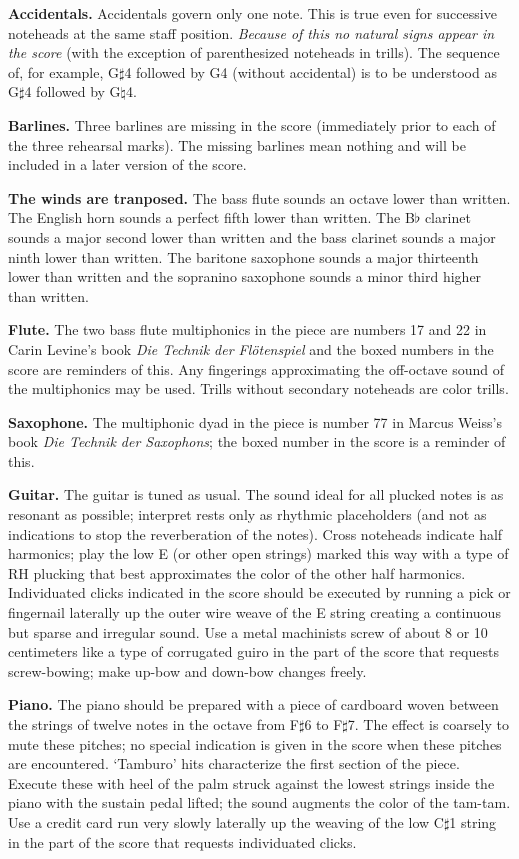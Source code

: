 \documentclass[10pt]{article}
\begin{document}
\begin{textblock}{23}
\textbf{Accidentals.} Accidentals govern only one note. This is true even for
successive noteheads at the same staff position. \textit{Because of this no
natural signs appear in the score} (with the exception of parenthesized
noteheads in trills). The sequence of, for example, G$\sharp$4 followed by
G4 (without accidental) is to be understood as G$\sharp$4 followed by
G$\natural$4.

\textbf{Barlines.} Three barlines are missing in the score (immediately prior
to each of the three rehearsal marks). The missing barlines mean nothing and
will be included in a later version of the score.

\textbf{The winds are tranposed.} The bass flute sounds an octave lower than
written. The English horn sounds a perfect fifth lower than written. The
B$\flat$ clarinet sounds a major second lower than written and the bass
clarinet sounds a major ninth lower than written. The baritone saxophone sounds
a major thirteenth lower than written and the sopranino saxophone sounds a
minor third higher than written.

\textbf{Flute.} The two bass flute multiphonics in the piece are numbers 17 and
22 in Carin Levine's book \textit{Die Technik der Flötenspiel} and the boxed
numbers in the score are reminders of this. Any fingerings approximating the
off-octave sound of the multiphonics may be used. Trills without secondary
noteheads are color trills.

\textbf{Saxophone.} The multiphonic dyad in the piece is number 77 in Marcus
Weiss's book \textit{Die Technik der Saxophons}; the boxed number in the score
is a reminder of this.

\textbf{Guitar.} The guitar is tuned as usual. The sound ideal for all plucked
notes is as resonant as possible; interpret rests only as rhythmic placeholders
(and not as indications to stop the reverberation of the notes). Cross
noteheads indicate half harmonics; play the low E (or other open strings)
marked this way with a type of RH plucking that best approximates the color of
the other half harmonics. Individuated clicks indicated in the score should be
executed by running a pick or fingernail laterally up the outer wire weave of
the E string creating a continuous but sparse and irregular sound. Use a metal
machinists screw of about 8 or 10 centimeters like a type of corrugated guiro
in the part of the score that requests screw-bowing; make up-bow and down-bow
changes freely.

\textbf{Piano.} The piano should be prepared with a piece of cardboard woven
between the strings of twelve notes in the octave from F$\sharp$6 to
F$\sharp$7. The effect is coarsely to mute these pitches; no special indication
is given in the score when these pitches are encountered. `Tamburo' hits
characterize the first section of the piece. Execute these with heel of the
palm struck against the lowest strings inside the piano with the sustain pedal
lifted; the sound augments the color of the tam-tam. Use a credit card run very
slowly laterally up the weaving of the low C$\sharp$1 string in the part of the
score that requests individuated clicks.


\end{textblock}
\end{document}
